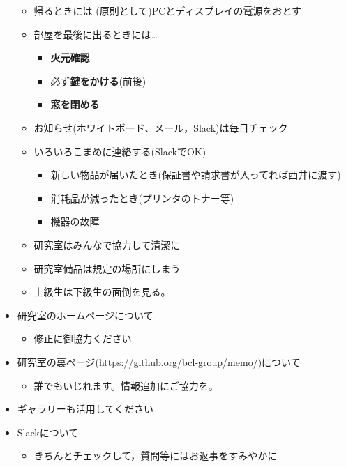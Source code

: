 \documentclass[11pt, ]{jsarticle}
\providecommand{\tightlist}{%
   \setlength{\itemsep}{0pt}\setlength{\parskip}{0pt}}
\begin{document}
\begin{itemize}
  \begin{itemize}
  \tightlist
  \item
    帰るときには (原則として)PCとディスプレイの電源をおとす
  \item
    部屋を最後に出るときには\ldots{}

    \begin{itemize}
    \tightlist
    \item
      \textbf{火元確認}
    \item
      必ず\textbf{鍵をかける}(前後)
    \item
      \textbf{窓を閉める}
    \end{itemize}
  \item
    お知らせ(ホワイトボード、メール，Slack)は毎日チェック
  \item
    いろいろこまめに連絡する(SlackでOK)

    \begin{itemize}
    \tightlist
    \item
      新しい物品が届いたとき(保証書や請求書が入ってれば西井に渡す)
    \item
      消耗品が減ったとき(プリンタのトナー等)
    \item
      機器の故障
    \end{itemize}
  \item
    研究室はみんなで協力して清潔に
  \item
    研究室備品は規定の場所にしまう
  \item
    上級生は下級生の面倒を見る。
  \end{itemize}
\item
  研究室のホームページについて

  \begin{itemize}
  \tightlist
  \item
    修正に御協力ください
  \end{itemize}
\item
  研究室の裏ページ(https://github.org/bcl-group/memo/)について

  \begin{itemize}
  \tightlist
  \item
    誰でもいじれます。情報追加にご協力を。
  \end{itemize}
\item
  ギャラリーも活用してください
\item
  Slackについて

  \begin{itemize}
  \tightlist
  \item
    きちんとチェックして，質問等にはお返事をすみやかに


\end{itemize}
\end{itemize}
\end{document}
